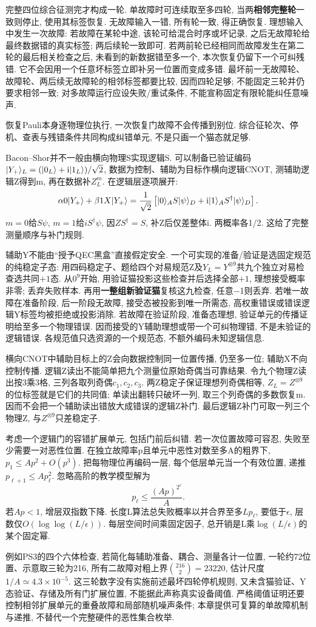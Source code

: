 完整四位综合征测完才构成一轮. 单故障时可连续取至多四轮, 当两\textbf{相邻完整轮}一致则停止, 使用其标签恢复. 无故障输入一错, 所有轮一致, 得正确恢复. 理想输入中发生一次故障: 若故障在某轮中途, 该轮可给混合时序或坏记录, 之后无故障轮给最终数据错的真实标签; 两后续轮一致即可. 若两前轮已经相同而故障发生在第二轮的最后相关检查之后, 未看到的新数据错至多一个, 本次恢复仍留下一个可纠残错. 它不会因用一个任意坏标签立即补另一位置而变成多错. 最坏前一无故障轮、故障轮、两后续无故障轮的相邻标签都要比较, 因而四轮足够; 不能固定三轮并仍要求相邻一致; 对多故障运行应设失败/重试条件, 不能宣称固定有限轮能纠任意噪声.

恢复Pauli本身逐物理位执行, 一次恢复门故障不会传播到别位. 综合征轮次、停机、查表与残错条件共同构成纠错单元, 不是只画一个猫态就足够.

Bacon--Shor并不一般由横向物理S实现逻辑S. 可以制备已验证编码$\lvert Y_+\rangle_L=(\lvert 0_L\rangle+\mathrm i\lvert 1_L\rangle)/\sqrt2$, 数据为控制、辅助为目标作横向逻辑CNOT, 测辅助逻辑Z得到m, 再在数据补$Z_L^m$. 在逻辑层逐项展开:
\[\alpha0\lvert Y_+\rangle+\beta1X\lvert Y_+\rangle
=\frac1{\sqrt2}\left[\lvert 0\rangle_A S\lvert \psi\rangle_D+\mathrm i\lvert 1\rangle_A S^\dagger\lvert \psi\rangle_D\right].\]
$m=0$给$S\psi$, $m=1$给$iS^\dagger\psi$, 因$ZS^\dagger=S$, 补Z后仅差整体i. 两概率各1/2. 这给了完整测量顺序与补门规则.

辅助Y不能由“授予QEC黑盒”直接假定安全. 一个可实现的准备/验证是选固定规范的纯稳定子态: 用四码稳定子、题给四个对易规范Z及$Y_L=Y^{\otimes9}$共九个独立对易检查选共同$+1$态. 从$0^9$开始, 用验证猫投影这些检查并后选择全部$+1$, 理想接受概率非零; 丢弃失败样本. 再用\textbf{一整组新验证猫}复核这九检查, 任意−1则丢弃. 若唯一故障在准备阶段, 后一阶段无故障, 接受态被投影到唯一所需态, 高权重错误或错误逻辑Y标签均被拒绝或投影消除. 若故障在验证阶段, 准备态理想, 验证单元的传播证明给至多一个物理错误. 因而接受的Y辅助理想或带一个可纠物理错, 不是未验证的逻辑错误. 各规范值只选资源的一个规范态, 不额外编码未知逻辑信息.

横向CNOT中辅助目标上的Z会向数据控制同一位置传播, 仍至多一位; 辅助X不向控制传播. 逻辑Z读出不能简单把九个测量位原始奇偶当可靠结果. 令九个物理Z读出按3乘3格, 三列各取列奇偶$c_1,c_2,c_3$. 两Z稳定子保证理想列奇偶相等, $Z_L=Z^{\otimes9}$的位标签就是它们的共同值; 单读出翻转只破坏一列, 取三个列奇偶的多数恢复m. 因而不会把一个辅助读出错放大成错误的逻辑Z补门. 最后逻辑Z补门可取一列三个物理Z, 与$Z^{\otimes9}$只差稳定子.

考虑一个逻辑门的容错扩展单元, 包括门前后纠错. 若一次位置故障可容忍, 失败至少需要一对恶性位置. 在独立故障率p且单元中恶性对数至多A的粗界下,$p_1\le Ap^2+O(p^3)$. 把每物理位再编码一层, 每个低层单元当一个有效位置, 递推$p_{\ell+1}\le A p_\ell^2$. 忽略高阶的教学模型解为
\[p_\ell\le\frac{(Ap)^{2^\ell}}A.\]
若$Ap<1$, 增层双指数下降. 长度L算法总失败概率以并合界至多$Lp_\ell$, 要低于$\epsilon$, 层数仅$O(\log\log(L/\epsilon))$. 每层空间时间乘固定因子, 总开销是L乘$\log(L/\epsilon)$的某个固定幂.

例如PS3的四个六体检查, 若简化每辅助准备、耦合、测量各计一位置, 一轮约72位置、示意取三轮为216, 所有二故障对粗上界$\binom{216}{2}=23220$, 估计尺度$1/A\simeq4.3\times10^{-5}$. 这三轮数字没有实施前述最坏四轮停机规则, 又未含猫验证、Y态验证、存储及所有门扩展位置, 不能据此声称真实设备阈值. 严格阈值证明还要控制相邻扩展单元的重叠故障和局部随机噪声条件; 本章提供可复算的单故障机制与递推, 不替代一个完整硬件的恶性集合枚举.
